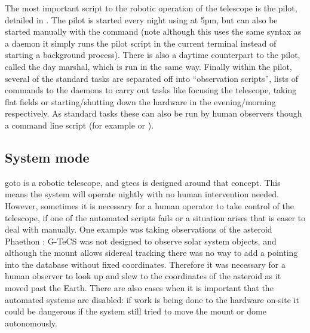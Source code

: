 \begin{colsection}
\begin{colsection}
The most important script to the robotic operation of the telescope is the pilot, detailed in . The pilot is started every night using  at 5pm, but can also be started manually with the command  (note although this uses the same syntax as a daemon it simply runs the pilot script in the current terminal instead of starting a background process). There is also a daytime counterpart to the pilot, called the day marshal, which is run in the same way. Finally within the pilot, several of the standard tasks are separated off into ``observation scripts'', lists of commands to the daemons to carry out tasks like focusing the telescope, taking flat fields or starting/shutting down the hardware in the evening/morning respectively. As standard tasks these can also be run by human observers though a command line script  (for example  or ).

\end{colsection}


\subsection{System mode}
\label{sec:mode}
\begin{colsection}

\gls{goto} is a robotic telescope, and \gls{gtecs} is designed around that concept. This means the system will operate nightly with no human intervention needed. However, sometimes it is necessary for a human operator to take control of the telescope, if one of the automated scripts fails or a situation arises that is easer to deal with manually. One example was taking observations of the asteroid Phaethon \citep{Phaethon}: G-TeCS was not designed to observe solar system objects, and although the mount allows sidereal tracking there was no way to add a pointing into the database without fixed coordinates. Therefore it was necessary for a human observer to look up and slew to the coordinates of the asteroid as it moved past the Earth. There are also cases when it is important that the automated systems are disabled: if work is being done to the hardware on-site it could be dangerous if the system still tried to move the mount or dome autonomously.



\end{colsection}
\end{colsection}
